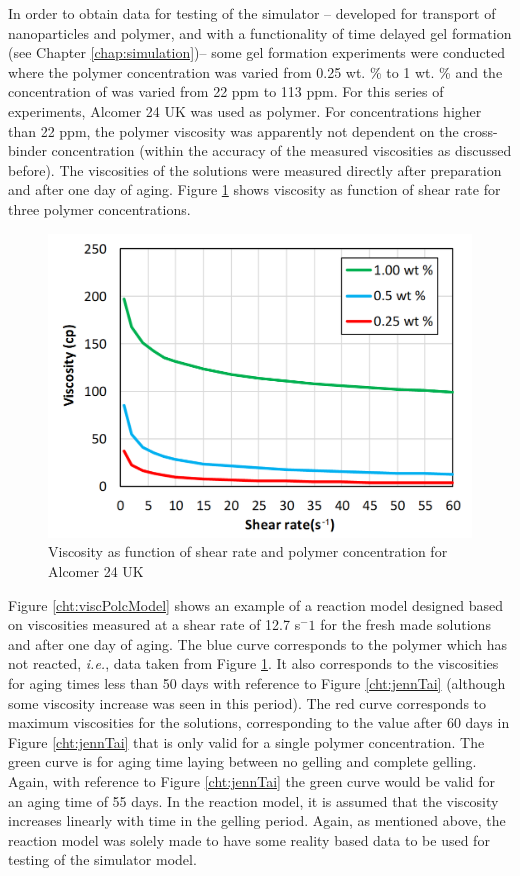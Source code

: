 In order to obtain data for testing of the simulator \--- developed for transport of nanoparticles and polymer, and with a functionality of time delayed gel formation (see Chapter \ref{chap:simulation})\--- some gel formation experiments were conducted where the polymer concentration was varied from 0.25 wt. \% to 1 wt. \% and the concentration of  was varied from 22 ppm to 113 ppm. For this series of experiments, Alcomer 24 UK was used as polymer. For concentrations higher than 22 ppm, the polymer viscosity was apparently not dependent on the cross-binder concentration (within the accuracy of the measured viscosities as discussed before). The viscosities of the solutions were measured directly after preparation and after one day of aging. Figure \ref{cht:viscAlco} shows viscosity as function of shear rate for three polymer concentrations. 
\begin{figure}
    \centering
    \includegraphics[width=.75\textwidth]{img/cht/viscAlcomer.png}
    \caption{Viscosity as function of shear rate and polymer concentration for Alcomer 24 UK}
    \label{cht:viscAlco}
\end{figure}

Figure \ref{cht:viscPolcModel} shows an example of a reaction model designed based on viscosities measured at a shear rate of 12.7 s$^-1$ for the fresh made solutions and after one day of aging. The blue curve corresponds to the polymer which has not reacted, \textit{i.e.}, data taken from Figure \ref{cht:viscAlco}. It also corresponds to the viscosities for aging times less than 50 days with reference to Figure \ref{cht:jennTai} (although some viscosity increase was seen in this period). The red curve corresponds to maximum viscosities for the solutions, corresponding to the value after 60 days in Figure \ref{cht:jennTai} that is only valid for a single polymer concentration. The green curve is for aging time laying between no gelling and complete gelling. Again, with reference to Figure \ref{cht:jennTai} the green curve would be valid for an aging time of 55 days. In the reaction model, it is assumed that the viscosity increases linearly with time in the gelling period. Again, as mentioned above, the reaction model was solely made to have some reality based data to be used for testing of the simulator model. 

